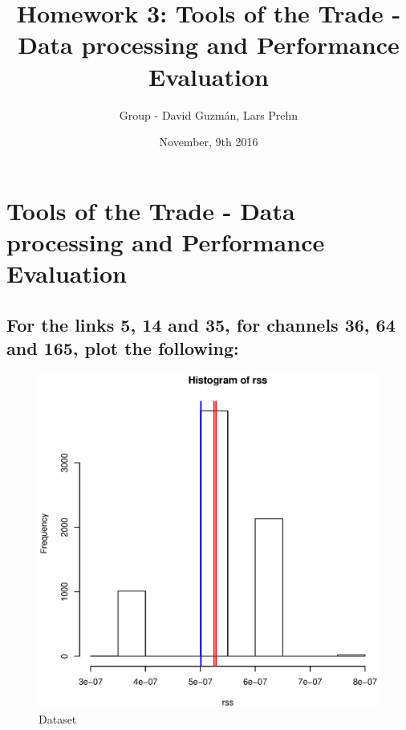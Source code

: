 \documentclass [12 pt , a4paper ] {article}
\begin{document}
\title{\huge \textbf { Homework 3: Tools of the Trade - Data processing and Performance
Evaluation}}
\date { November, 9th 2016 }
\author { Group  - David Guzm\'an, Lars Prehn }
\maketitle
\tableofcontents{}
\newpage
\section{Tools of the Trade - Data processing and Performance
Evaluation}
\subsection{For the links 5, 14 and 35, for channels 36, 64 and 165, plot the following:}
\cite{schiller}
\begin{figure}[!ht]
  \centering
  \includegraphics[scale=0.2]{link-5-channel-36.eps}
  \caption{Dataset}
  \label{fig:Dataset}
\end{figure}
\end{document}
